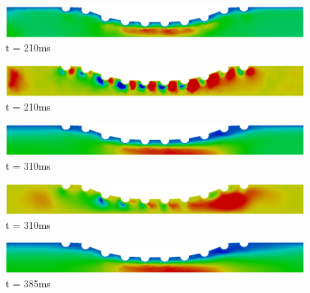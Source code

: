 \documentclass[10pt,fleqn,a4paper,twoside]{article}
\begin{document}
\begin{figure}[H]
\widefigure
     \begin{minipage}{.45\linewidth}
      \centering
      \includegraphics[scale=0.17]{./figure/horizontalVelocity1.png}\\
      t = 210ms
     \end{minipage}%
     \begin{minipage}{.45\linewidth}
      \centering
      \includegraphics[scale=0.17]{./figure/verticalVelocity1.png}\\
      t = 210ms
     \end{minipage}
     \begin{minipage}{.45\linewidth}
     \medskip
      \centering
      \includegraphics[scale=0.17]{./figure/horizontalVelocity2.png}\\
      t = 310ms
     \end{minipage}%
     \begin{minipage}{.45\linewidth}
     \medskip
      \centering
      \includegraphics[scale=0.17]{./figure/verticalVelocity2.png}\\
      t = 310ms
     \end{minipage}
     \begin{minipage}{.45\linewidth}
      \centering
      \includegraphics[scale=0.17]{./figure/horizontalVelocity3.png}\\
      t = 385ms
     \end{minipage}%
     \begin{minipage}{.45\linewidth}
      \centering

\end{minipage}
\end{figure}
\end{document}

